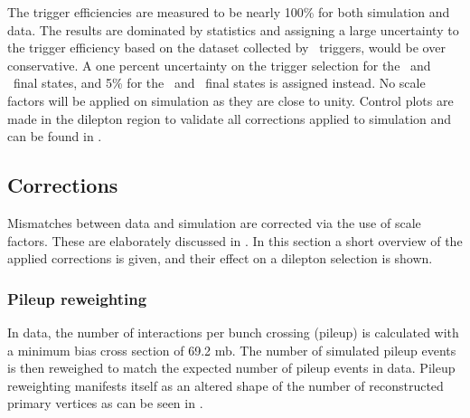 The trigger efficiencies are measured to be nearly 100\% for both simulation and data. The results are dominated by statistics and assigning a large uncertainty to the trigger efficiency based on the dataset collected by \Etmis\ triggers, would be over conservative. A one percent uncertainty on the trigger selection for the \eemu\ and \mumumu\ final states, and 5\% for the \eee\ and \emumu\ final states is assigned instead. No scale factors will be applied on simulation as they are close to unity. Control plots are made in the dilepton region to validate all corrections applied to simulation and can be found in  .

\subsection{Corrections}
\label{sec:corrections}
Mismatches between data and simulation are corrected via the use of scale factors. These are elaborately discussed in . In this section a short overview of the applied corrections is given, and their effect on a dilepton selection is shown. 

\subsubsection*{Pileup reweighting}
In data, the number of interactions per bunch crossing (pileup) is calculated with a minimum bias cross section of 69.2 mb. The number of simulated pileup events is then reweighed to match the expected number of pileup events in data. Pileup reweighting manifests itself as an altered shape of the number of reconstructed primary vertices as can be seen in .

